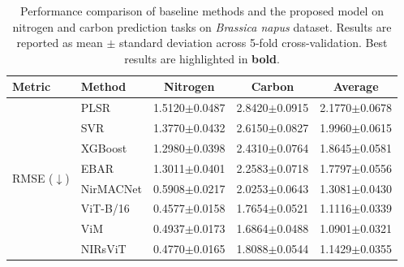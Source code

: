 \documentclass[pdflatex,sn-mathphys-num]{sn-jnl}%
\begin{document}
\begin{table}
\caption{
Performance comparison of baseline methods and the proposed model on nitrogen and carbon prediction tasks on \textit{Brassica napus} dataset. Results are reported as mean $\pm$ standard deviation across 5-fold cross-validation. Best results are highlighted in \textbf{bold}.
}
\label{tab:brassica-napus-results}

\centering
\small
\setlength{\tabcolsep}{8pt}
\renewcommand{\arraystretch}{1.15}

\begin{tabular*}{\textheight}{@{\extracolsep\fill}llccc}
\toprule

Metric & Method & Nitrogen & Carbon & Average \\

\midrule

\multirow{9}{*}{RMSE ($\downarrow$)}

& PLSR
& 1.5120{\scriptsize$\pm$0.0487}
& 2.8420{\scriptsize$\pm$0.0915}
& 2.1770{\scriptsize$\pm$0.0678} \\

& SVR
& 1.3770{\scriptsize$\pm$0.0432}
& 2.6150{\scriptsize$\pm$0.0827}
& 1.9960{\scriptsize$\pm$0.0615} \\

& XGBoost
& 1.2980{\scriptsize$\pm$0.0398}
& 2.4310{\scriptsize$\pm$0.0764}
& 1.8645{\scriptsize$\pm$0.0581} \\

& EBAR \cite{phan2025ebar}
& 1.3011{\scriptsize$\pm$0.0401}
& 2.2583{\scriptsize$\pm$0.0718}
& 1.7797{\scriptsize$\pm$0.0556} \\

\cmidrule(lr){2-5}

& NirMACNet \cite{phuong2025nirmacnet}
& 0.5908{\scriptsize$\pm$0.0217}
& 2.0253{\scriptsize$\pm$0.0643}
& 1.3081{\scriptsize$\pm$0.0430} \\

& ViT-B/16 \cite{dosovitskiy2021image}
& 0.4577{\scriptsize$\pm$0.0158}
& 1.7654{\scriptsize$\pm$0.0521}
& 1.1116{\scriptsize$\pm$0.0339} \\

& ViM \cite{zhu2024vision}
& 0.4937{\scriptsize$\pm$0.0173}
& 1.6864{\scriptsize$\pm$0.0488}
& 1.0901{\scriptsize$\pm$0.0321} \\

& NIRsViT \cite{van2024nirsvit}
& 0.4770{\scriptsize$\pm$0.0165}
& 1.8088{\scriptsize$\pm$0.0544}
& 1.1429{\scriptsize$\pm$0.0355} \\


\end{tabular*}
\end{table}
\end{document}
